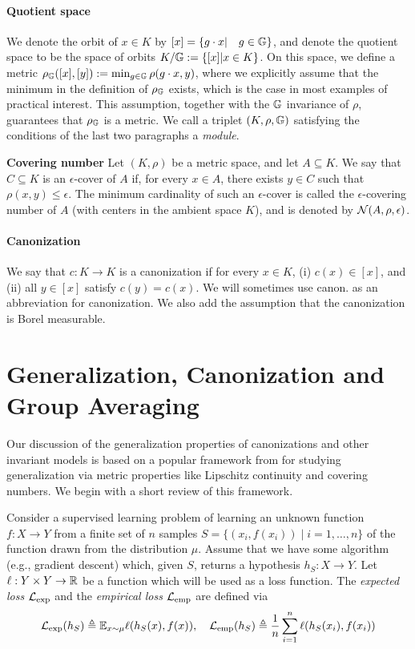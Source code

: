 \documentclass{article}
\begin{document}
\paragraph{Quotient space} We denote the orbit of $x\in K$ by  $[x]=\{g\cdot x| \quad g\in \mathbb{G} \}$, and denote the quotient space to be the space of orbits $K/\mathbb{G}:=\{[x]|x \in K\}$. On this space, we define a metric $\rho_{\mathbb{G}}([x],[y]):=\min_{g \in \mathbb{G}}\rho(g\cdot x,y)$, where we explicitly assume that the minimum in the definition of $\rho_{\mathbb{G}}$  exists, which is the case in most examples of practical interest. This assumption, together with the $\mathbb{G}$ invariance of $\rho$, guarantees that $\rho_{\mathbb{G}}$ is a metric. We call a triplet $(K,\rho,\mathbb{G})$ satisfying the conditions of the last two paragraphs a \emph{module}.

\textbf{Covering number}
Let $(K,\rho)$ be a metric space, and let $A\subseteq K$. We say that $C\subseteq K$ is an $\epsilon$-cover of $A$ if, for every $x\in A$, there exists $y\in C$ such that $\rho(x,y)\leq\epsilon$. The minimum cardinality of such an $\epsilon$-cover is called the $\epsilon$-covering number of $A$ (with centers in the ambient space $K$), and is denoted by $\mathcal{N}(A,\rho,\epsilon)$.

\paragraph{Canonization} 
We say that $c:K \rightarrow K$ is a canonization if for every $x\in K$, (i) $c(x)\in [x]$, and (ii) all  $y\in [x]$ satisfy $c(y)=c(x) $. We will sometimes use canon. as an abbreviation for canonization. We also add the assumption that the canonization is Borel measurable.



\section{Generalization, Canonization and Group Averaging}\label{sec:gen}
Our discussion of the generalization properties of canonizations and other invariant models is based on a popular framework from \cite{xu_robustness_2012} for studying generalization via metric properties like Lipschitz continuity and covering numbers. We begin with a short review of this framework. 

Consider a supervised learning problem of learning an unknown function $f:X\to Y $ from a finite set of $n$ samples $S=\{(x_i,f(x_i)) \mid i=1,\ldots,n \}$ of the function drawn from the distribution $\mu$. Assume that we have some algorithm (e.g., gradient descent) which, given $S$, returns a hypothesis $h_S:X \to Y $. Let $\ell:Y \times Y \to \mathbb{R}  $ be a function which will be used as a loss function. The \emph{expected loss} $\mathcal{L}_{\mathrm{exp}}$ and the \emph{empirical loss} $\mathcal{L}_{\mathrm{emp}} $ are defined via 
$$\mathcal{L}_{\mathrm{exp}}(h_S) \triangleq \mathbb{E}_{x \sim \mu} \ell(h_S(x),f(x)), \quad \mathcal{L}_{\mathrm{emp}}(h_S)\triangleq\frac{1}{n}\sum_{i=1}^n \ell(h_S(x_i),f(x_i))$$
\end{document}

